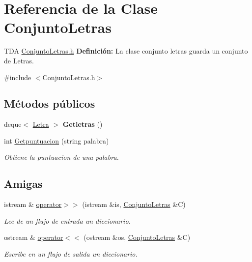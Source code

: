 \hypertarget{class_conjunto_letras}{}\section{Referencia de la Clase Conjunto\+Letras}
\label{class_conjunto_letras}


T\+DA \hyperlink{_conjunto_letras_8h}{Conjunto\+Letras.\+h} {\bfseries Definición\+:} La clase conjunto letras guarda un conjunto de Letras.  




{\ttfamily \#include $<$Conjunto\+Letras.\+h$>$}

\subsection*{Métodos públicos}
\begin{DoxyCompactItemize}
\item 
deque$<$ \hyperlink{class_letra}{Letra} $>$ {\bfseries Getletras} ()\hypertarget{class_conjunto_letras_a7c8bb085fb038255526752a6dcdcf422}{}\label{class_conjunto_letras_a7c8bb085fb038255526752a6dcdcf422}

\item 
int \hyperlink{class_conjunto_letras_ad4e5706a02bf4875569cb6e177ff5902}{Getpuntuacion} (string palabra)
\begin{DoxyCompactList}\small\item\em Obtiene la puntuacion de una palabra. \end{DoxyCompactList}\end{DoxyCompactItemize}
\subsection*{Amigas}
\begin{DoxyCompactItemize}
\item 
istream \& \hyperlink{class_conjunto_letras_af5ad9e43f9a723151641010c62c9e8c0}{operator$>$$>$} (istream \&is, \hyperlink{class_conjunto_letras}{Conjunto\+Letras} \&C)
\begin{DoxyCompactList}\small\item\em Lee de un flujo de entrada un diccionario. \end{DoxyCompactList}\item 
ostream \& \hyperlink{class_conjunto_letras_a2bf98947859e69ca0855fe70eb0343ff}{operator$<$$<$} (ostream \&os, \hyperlink{class_conjunto_letras}{Conjunto\+Letras} \&C)
\begin{DoxyCompactList}\small\item\em Escribe en un flujo de salida un diccionario. \end{DoxyCompactList}\end{DoxyCompactItemize}


